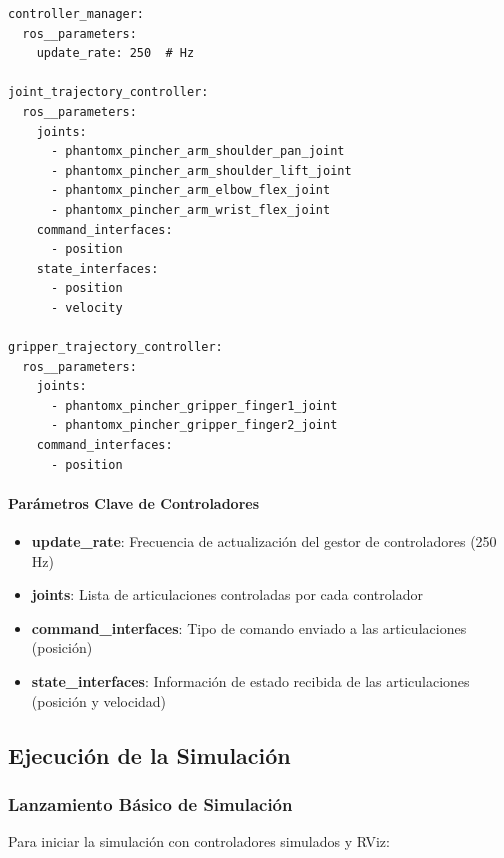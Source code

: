 \begin{verbatim}
controller_manager:
  ros__parameters:
    update_rate: 250  # Hz

joint_trajectory_controller:
  ros__parameters:
    joints:
      - phantomx_pincher_arm_shoulder_pan_joint
      - phantomx_pincher_arm_shoulder_lift_joint
      - phantomx_pincher_arm_elbow_flex_joint
      - phantomx_pincher_arm_wrist_flex_joint
    command_interfaces:
      - position
    state_interfaces:
      - position
      - velocity

gripper_trajectory_controller:
  ros__parameters:
    joints:
      - phantomx_pincher_gripper_finger1_joint
      - phantomx_pincher_gripper_finger2_joint
    command_interfaces:
      - position
\end{verbatim}

\paragraph{Parámetros Clave de Controladores}

\begin{itemize}
    \item \textbf{update\_rate}: Frecuencia de actualización del gestor de controladores (250 Hz)
    \item \textbf{joints}: Lista de articulaciones controladas por cada controlador
    \item \textbf{command\_interfaces}: Tipo de comando enviado a las articulaciones (posición)
    \item \textbf{state\_interfaces}: Información de estado recibida de las articulaciones (posición y velocidad)
\end{itemize}

\subsection{Ejecución de la Simulación}

\subsubsection{Lanzamiento Básico de Simulación}

Para iniciar la simulación con controladores simulados y RViz:

